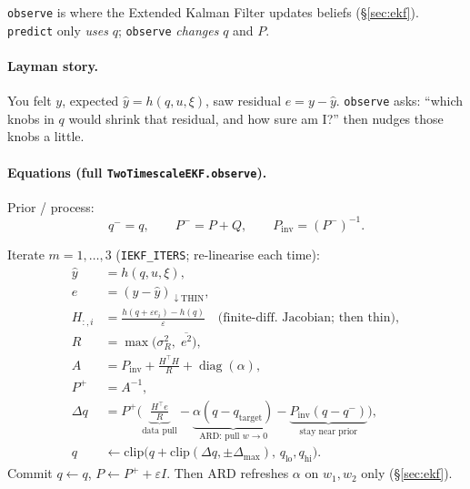 \documentclass[11pt,a4paper]{article}
\DeclareMathOperator{\diag}{diag}
\begin{document}
\texttt{observe} is where the Extended Kalman Filter updates beliefs
(\S\ref{sec:ekf}).  \texttt{predict} only \emph{uses} $q$; \texttt{observe}
\emph{changes} $q$ and $P$.

\paragraph{Layman story.}
You felt $y$, expected $\hat y=h(q,u,\xi)$, saw residual $e=y-\hat y$.
\texttt{observe} asks: ``which knobs in $q$ would shrink that residual, and how
sure am I?'' then nudges those knobs a little.

\paragraph{Equations (full \texttt{TwoTimescaleEKF.observe}).}

Prior / process:
\begin{equation}
q^- = q,\qquad P^- = P+Q,\qquad P_{\mathrm{inv}}=(P^-)^{-1}.
\label{eq:l4prior}
\end{equation}

Iterate $m=1,\ldots,3$ (\texttt{IEKF\_ITERS}; re-linearise each time):
\begin{align}
\hat y &= h(q,u,\xi), \label{eq:l4obs1}\\
e &= (y-\hat y)_{\downarrow\mathrm{THIN}}, \label{eq:l4obs2}\\
H_{:,i} &= \frac{h(q+\varepsilon e_i)-h(q)}{\varepsilon}
  \quad\text{(finite-diff.\ Jacobian; then thin)}, \label{eq:l4obs3}\\
R &= \max\bigl(\sigma_R^2,\;\overline{e^2}\bigr), \label{eq:l4obs4}\\
A &= P_{\mathrm{inv}} + \frac{H^\top H}{R} + \diag(\alpha), \label{eq:l4obs5}\\
P^+ &= A^{-1}, \label{eq:l4obs6}\\
\Delta q &= P^+\Biggl(
  \underbrace{\frac{H^\top e}{R}}_{\text{data pull}}
  -\underbrace{\alpha(q-q_{\mathrm{target}})}_{\text{ARD: pull }w\to0}
  -\underbrace{P_{\mathrm{inv}}(q-q^-)}_{\text{stay near prior}}
\Biggr), \label{eq:l4obs7}\\
q &\leftarrow \mathrm{clip}\bigl(q+\mathrm{clip}(\Delta q,\pm\Delta_{\max}),\,q_{\mathrm{lo}},q_{\mathrm{hi}}\bigr).
\label{eq:l4obs8}
\end{align}
Commit $q\leftarrow q$, $P\leftarrow P^++\varepsilon I$.  Then ARD refreshes
$\alpha$ on $w_1,w_2$ only (\S\ref{sec:ekf}).
\end{document}
